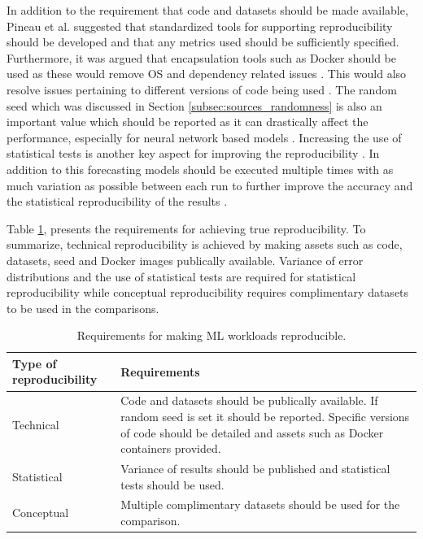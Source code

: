 In addition to the requirement that code and datasets should be made available, Pineau et al. suggested that standardized tools for supporting reproducibility should be developed and that any metrics used should be sufficiently specified. Furthermore, it was argued that encapsulation tools such as Docker should be used as these would remove OS and dependency related issues \cite{pineau2020improving}. This would also resolve issues pertaining to different versions of code being used \cite{beam2020challenges}. The random seed which was discussed in Section \ref{subsec:sources_randomness} is also an important value which should be reported as it can drastically affect the performance, especially for neural network based models \cite{beam2020challenges, bouthillier2021accounting}. Increasing the use of statistical tests is another key aspect for improving the reproducibility \cite{mcdermott2019reproducibility}. In addition to this forecasting models should be executed multiple times with as much variation as possible between each run to further improve the accuracy and the statistical reproducibility of the results
\cite{bouthillier2021accounting}.

Table \ref{tab:reproducibility}, presents the requirements for achieving true reproducibility. To summarize, technical reproducibility is achieved by making assets such as code, datasets, seed and Docker images publically available. Variance of error distributions and the use of statistical tests are required for statistical reproducibility while conceptual reproducibility requires complimentary datasets to be used in the comparisons.

\begin{table}[h]
  \centering
  \begin{tabularx}{\textwidth}{|l|X|}
    \hline
    Type of reproducibility & Requirements                                                                                                                                                                               \\
    \hline
    \hline
    Technical               & Code and datasets should be publically available. If random seed is set it should be reported. Specific versions of code should be detailed and assets such as Docker containers provided. \\
    \hline
    Statistical             & Variance of results should be published and statistical tests should be used.                                                                                                              \\
    \hline
    Conceptual              & Multiple complimentary datasets should be used for the comparison.                                                                                                                         \\
    \hline
  \end{tabularx}
  \caption{Requirements for making ML workloads reproducible.}
  \label{tab:reproducibility}
\end{table}


